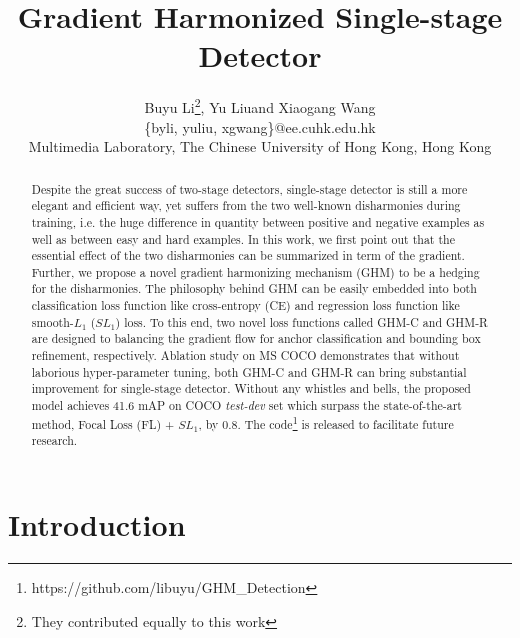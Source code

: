 \documentclass[letterpaper]{article} \usepackage{aaai19}  \usepackage{times}  \usepackage{helvet}  \usepackage{courier}  \usepackage{url}  \usepackage{graphicx}  \usepackage{amsmath,amssymb}
\begin{document}
\title{Gradient Harmonized Single-stage Detector}
\author{Buyu Li\thanks{They contributed equally to this work}, Yu Liu\footnotemark[1] and Xiaogang Wang\\
\{byli, yuliu, xgwang\}@ee.cuhk.edu.hk\\
Multimedia Laboratory, The Chinese University of Hong Kong, Hong Kong\\
}
\maketitle
\begin{abstract}
Despite the great success of two-stage detectors, single-stage detector is still a more elegant and efficient way, yet suffers from the two well-known disharmonies during training, i.e. the huge difference in quantity between positive and negative examples as well as between easy and hard examples. In this work, we first point out that the essential effect of the two disharmonies can be summarized in term of the gradient. Further, we propose a novel gradient harmonizing mechanism (GHM) to be a hedging for the disharmonies. The philosophy behind GHM can be easily embedded into both classification loss function like cross-entropy (CE) and regression loss function like smooth-$L_1$ ($SL_1$) loss. To this end, two novel loss functions called GHM-C and GHM-R are designed to balancing the gradient flow for anchor classification and bounding box refinement, respectively. Ablation study on MS COCO demonstrates that without laborious hyper-parameter tuning, both GHM-C and GHM-R can bring substantial improvement for single-stage detector. Without any whistles and bells, the proposed model achieves 41.6 mAP on COCO \textit{test-dev} set which surpass the state-of-the-art method, Focal Loss (FL) + $SL_1$, by 0.8. The code\footnote{https://github.com/libuyu/GHM\_Detection} is released to facilitate future research. 
\end{abstract}

\section{Introduction}
\end{document}
